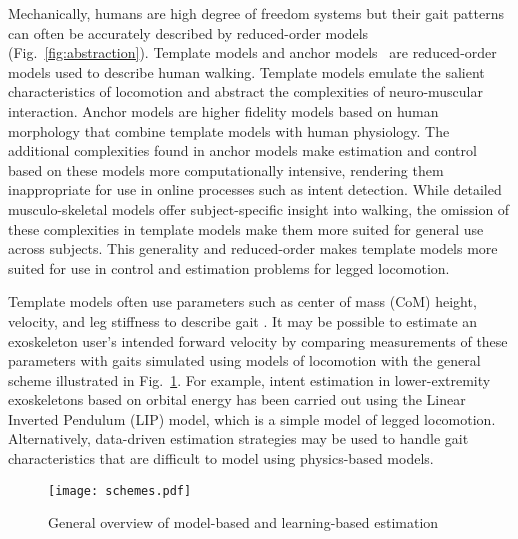 Mechanically, humans are high degree of freedom systems but their gait patterns can often be accurately described by reduced-order models (Fig.~\ref{fig:abstraction}). Template models and anchor models~\cite{full1999templates} are reduced-order models used to describe human walking. Template models emulate the salient characteristics of locomotion and abstract the complexities of neuro-muscular interaction. Anchor models are higher fidelity models based on human morphology that combine template models with human physiology. The additional complexities found in anchor models make estimation and control based on these models more computationally intensive, rendering them inappropriate for use in online processes such as intent detection. While detailed musculo-skeletal models offer subject-specific insight into walking, the omission of these complexities in template models make them more suited for general use across subjects. This generality and reduced-order makes template models more suited for use in control and estimation problems for legged locomotion.

Template models often use parameters such as center of mass (CoM) height, velocity, and leg stiffness to describe gait \cite{geyer2006compliant,liu2015dynamic,full1999templates,sharbafi2015fmch}. It may be possible to estimate an exoskeleton user's intended forward velocity by comparing measurements of these parameters with gaits simulated using models of locomotion with the general scheme illustrated in Fig.~\ref{fig:schemes}. For example, intent estimation in lower-extremity exoskeletons based on orbital energy \cite{chen2018dynamic} has been carried out using the Linear Inverted Pendulum (LIP) model, which is a simple model of legged locomotion.  Alternatively, data-driven estimation strategies \cite{ge2011neural, kalinowska2019data, joukov2017rhythmic} may be used to handle gait characteristics that are difficult to model using physics-based models.

\begin{figure}
	\centering
	\texttt{[image: schemes.pdf]}
	\caption{General overview of model-based and learning-based estimation}\label{fig:schemes}
\end{figure}

